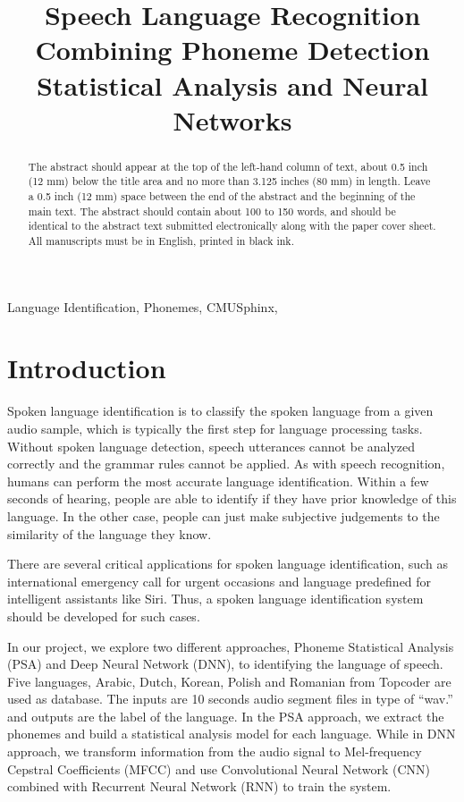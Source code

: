 \documentclass{article}
\title{Speech Language Recognition Combining Phoneme Detection Statistical Analysis and Neural Networks}
\begin{document}
%
\maketitle
%
\begin{abstract}
The abstract should appear at the top of the left-hand column of text, about
0.5 inch (12 mm) below the title area and no more than 3.125 inches (80 mm) in
length.  Leave a 0.5 inch (12 mm) space between the end of the abstract and the
beginning of the main text.  The abstract should contain about 100 to 150
words, and should be identical to the abstract text submitted electronically
along with the paper cover sheet.  All manuscripts must be in English, printed
in black ink.
\end{abstract}
%
\begin{keywords}
Language Identification, Phonemes, CMUSphinx,
\end{keywords}
%
\section{Introduction}
\label{sec:intro}
Spoken language identification is to classify the spoken language from a given audio sample, which is typically the first step for language processing tasks. Without spoken language detection, speech utterances cannot be analyzed correctly and the grammar rules cannot be applied. As with speech recognition, humans can perform the most accurate language identification.\cite{shi2006importance} Within a few seconds of hearing, people are able to identify if they have prior knowledge of this language. In the other case, people can just make subjective judgements to the similarity of the language they know.

There are several critical applications for spoken language identification, such as international emergency call for urgent occasions and language predefined for intelligent assistants like Siri. 
Thus, a spoken language identification system should be developed for such cases.

In our project, we explore two different approaches, Phoneme Statistical Analysis (PSA) and Deep Neural Network (DNN), to identifying the language of speech. Five languages, Arabic, Dutch, Korean, Polish and Romanian from Topcoder are used as database. The inputs are 10  seconds audio segment files in type of “wav.” and outputs are the label of the language. In the PSA approach, we extract the phonemes and build a statistical analysis model for each language. While in DNN approach, we transform information from the audio signal to Mel-frequency Cepstral Coefficients (MFCC) and use Convolutional Neural Network (CNN) combined with Recurrent Neural Network (RNN) to train the system.
\end{document}
